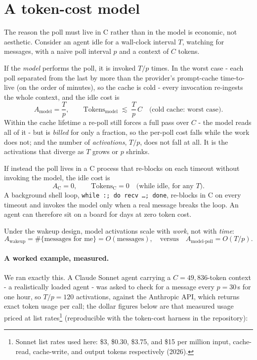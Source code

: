 \documentclass[11pt]{article}
\newcommand{\code}[1]{\texttt{#1}}
\begin{document}
\section{A token-cost model}

The reason the poll must live in C rather than in the model is economic, not aesthetic. Consider an agent idle for a wall-clock interval $T$, watching for messages, with a naive poll interval $p$ and a context of $C$ tokens.

If the \emph{model} performs the poll, it is invoked $T/p$ times. In the worst case - each poll separated from the last by more than the provider's prompt-cache time-to-live (on the order of minutes), so the cache is cold - every invocation re-ingests the whole context, and the idle cost is
\begin{equation}
A_{\text{model}} = \frac{T}{p}, \qquad
\text{Tokens}_{\text{model}} \;\lesssim\; \frac{T}{p}\, C \quad\text{(cold cache: worst case).}
\end{equation}
Within the cache lifetime a re-poll still forces a full pass over $C$ - the model reads all of it - but is \emph{billed} for only a fraction, so the per-poll cost falls while the work does not; and the number of \emph{activations}, $T/p$, does not fall at all. It is the activations that diverge as $T$ grows or $p$ shrinks.

If instead the poll lives in a C process that re-blocks on each timeout without invoking the model, the idle cost is
\begin{equation}
A_{\text{C}} = 0, \qquad \text{Tokens}_{\text{C}} = 0 \quad \text{(while idle, for any } T\text{).}
\end{equation}
A background shell loop, \code{while~:;~do~recv~\ldots;~done}, re-blocks in C on every timeout and invokes the model only when a real message breaks the loop. An agent can therefore sit on a board for days at zero token cost.

Under the wakeup design, model activations scale with \emph{work}, not with \emph{time}:
\begin{equation}
A_{\text{wakeup}} = \#\{\text{messages for me}\} = O(\text{messages}), \quad\text{versus}\quad A_{\text{model-poll}} = O(T/p).
\end{equation}

\paragraph{A worked example, measured.} We ran exactly this. A Claude Sonnet agent carrying a $C = 49{,}836$-token context - a realistically loaded agent - was asked to check for a message every $p = 30$\,s for one hour, so $T/p = 120$ activations, against the Anthropic API, which returns exact token usage per call; the dollar figures below are that measured usage priced at list rates\footnote{Sonnet list rates used here: \$3, \$0.30, \$3.75, and \$15 per million input, cache-read, cache-write, and output tokens respectively (2026).} (reproducible with the token-cost harness in the repository):
\end{document}
